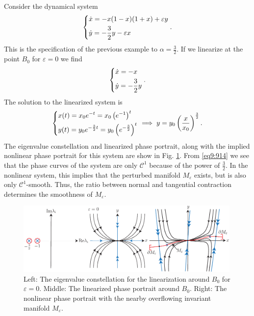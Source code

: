 \begin{ex}[]
	Consider the dynamical system
	\begin{align}
		\begin{dcases}
			\dot{x} = -x(1-x)(1+x) + \varepsilon y \\
			\dot{y} = - \frac{3}{2} y - \varepsilon x
		\end{dcases}
.		
	\end{align}
	This is the specification of the previous example to $\alpha = \frac{3}{2}$. If we linearize at the point $B_0$ for $\varepsilon = 0 $ we find
	\begin{align}
	\begin{dcases}
		\dot{x} = - x \\
		\dot{y} = -\frac{3}{2} y
	\end{dcases}
	.	
	\end{align}
	The solution to the linearized system is
	\begin{align}
		\begin{dcases}
			x(t) = x_0 e^{-t} = x_0 \left(e^{-1} \right)^{t} \\
			y(t) = y_0 e^{-\frac{3}{2}t} = y_0 \left(e^{-\frac{3}{2}}\right)^{t}
		\end{dcases}
		\implies y = y_0 \left(\frac{x}{x_0}\right)^{\frac{3}{2}}. \label{eq9:914}
	\end{align}
	The eigenvalue constellation and linearized phase portrait, along with the implied nonlinear phase portrait for this system are show in Fig. \ref{fig:alpha_specification}. From \eqref{eq9:914} we see that the phase curves of the system are only $\mathcal{C}^1$ because of the power of $\frac{3}{2}$. In the nonlinear system, this implies that the perturbed manifold $M_\varepsilon$ exists, but is also only $\mathcal{C}^1$-smooth. Thus, the ratio between normal and tangential contraction determines the smoothness of $M_\varepsilon$.
	\begin{figure}[h!]
		\centering
		\includegraphics[width=0.99\textwidth]{figures/ch9/12alpha_specification.pdf}
		\caption{Left: The eigenvalue constellation for the linearization around $B_0$ for $\varepsilon=0$. Middle: The linearized phase portrait around $B_0$. Right: The nonlinear phase portrait with the nearby overflowing invariant manifold $M_{\varepsilon}$.}
		\label{fig:alpha_specification}
	\end{figure}


\end{ex}
